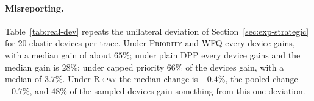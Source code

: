 \documentclass[preprint,11pt]{elsarticle}
\theoremstyle{definition}
\theoremstyle{remark}
\newcommand{\repay}{\textsc{Repay}}
\begin{document}
\begin{table}[t]
\centering
\caption{Trace-driven scenario: unilateral misreport under \repay{} and under the variant without the debt price, for several $V$ ($120$ devices on six traces). The bound is $B_{g,\mathrm{v}}$ at that $V$ for the tier of the device.}
\label{tab:real-sweep-dev}
\end{table}

\paragraph{Misreporting.}
Table~\ref{tab:real-dev} repeats the unilateral deviation of Section~\ref{sec:exp-strategic} for $20$ elastic devices per trace.
Under \textsc{Priority} and \textsc{WFQ} every device gains, with a median gain of about $65\%$; under plain DPP every device gains and the median gain is $28\%$; under capped priority $66\%$ of the devices gain, with a median of $3.7\%$.
Under \repay{} the median change is $-0.4\%$, the pooled change $-0.7\%$, and $48\%$ of the sampled devices gain something from this one deviation.
\end{document}
